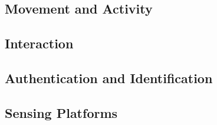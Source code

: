 \subsection{Movement and Activity}
\label{Background:SensingWithEarables:Movement}

\subsection{Interaction}
\label{Background:SensingWithEarables:Interaction}

\subsection{Authentication and Identification}
\label{Background:SensingWithEarables:Authentication}

\subsection{Sensing Platforms}
\label{Background:SensingWithEarables:SensingPlatforms}


